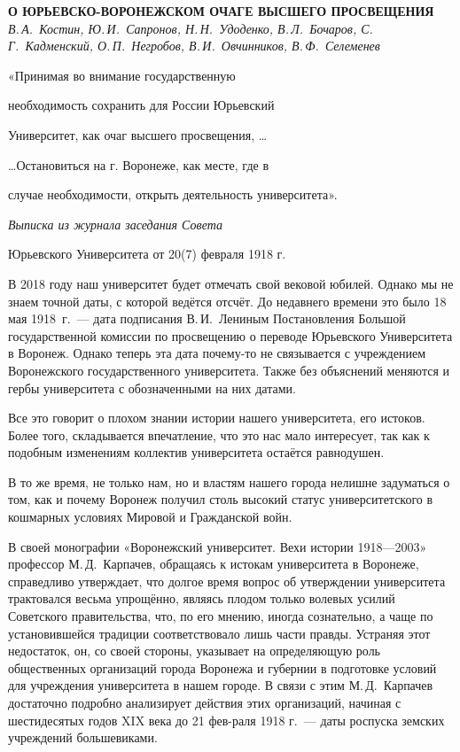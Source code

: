 \begin{center}{ \bf  О ЮРЬЕВСКО-ВОРОНЕЖСКОМ ОЧАГЕ ВЫСШЕГО ПРОСВЕЩЕНИЯ}\\
{\it В.\,А.~Костин, Ю.\,И.~Сапронов, Н.\,Н.~Удоденко, В.\,Л.~Бочаров, С.\,Г.~Кадменский, О.\,П.~Негробов, В.\,И.~Овчинников, В.\,Ф.~Селеменев
} \\
\end{center}

\begin{flushright}
«Принимая во внимание государственную

необходимость сохранить для России Юрьевский

Университет, как очаг высшего просвещения, …

…Остановиться на г. Воронеже, как месте, где в

случае необходимости, открыть деятельность университета».

{\it Выписка из журнала заседания Совета

Юрьевского Университета от 20(7) февраля 1918 г.}
\end{flushright}
В	2018 году наш университет будет отмечать свой вековой юбилей. Однако мы не знаем точной даты, с которой ведётся отсчёт. До недавнего времени это было 18 мая 1918~г.~--- дата подписания В.\,И.~Лениным Постановления Большой государственной комиссии по просвещению о переводе Юрьевского Университета в	Воронеж. Однако теперь эта дата \linebreak почему-то не связывается с учреждением Воронежского государственного университета. Также без объяснений меняются и гербы университета с обозначенными на них датами.

Все это говорит о плохом знании истории нашего университета, его истоков. Более того, складывается впечатление, что это нас мало интересует, так как к подобным изменениям коллектив университета остаётся равнодушен.

В	то же время, не только нам, но и властям нашего города нелишне задуматься о том, как и почему Воронеж получил столь высокий статус университетского в кошмарных условиях Мировой и Гражданской войн.

В	своей монографии «Воронежский университет. Вехи истории 1918—2003» профессор М.\,Д.~Карпачев, обращаясь к истокам университета в Воронеже, справедливо утверждает, что долгое время вопрос об утверждении университета трактовался весьма упрощённо, являясь плодом только волевых усилий Советского правительства, что, по его мнению, иногда сознательно, а чаще по установившейся традиции соответствовало лишь части правды. Устраняя этот недостаток, он, со своей стороны, указывает на определяющую роль общественных организаций города Воронежа и губернии в подготовке условий для учреждения университета в нашем городе. В связи с	этим М.\,Д.~Карпачев достаточно подробно анализирует действия этих организаций, начиная с шестидесятых годов XIX века до 21 фев-раля 1918 г.~--- даты роспуска земских учреждений большевиками.

